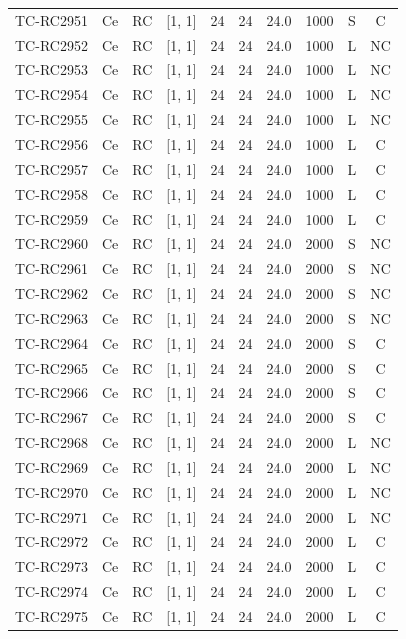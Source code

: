 \begin{longtable}{lccccccccc}
TC-RC2951 & Ce & RC & [1, 1] & 24 & 24 & 24.0 & 1000 & S & C \\
TC-RC2952 & Ce & RC & [1, 1] & 24 & 24 & 24.0 & 1000 & L & NC \\
TC-RC2953 & Ce & RC & [1, 1] & 24 & 24 & 24.0 & 1000 & L & NC \\
TC-RC2954 & Ce & RC & [1, 1] & 24 & 24 & 24.0 & 1000 & L & NC \\
TC-RC2955 & Ce & RC & [1, 1] & 24 & 24 & 24.0 & 1000 & L & NC \\
TC-RC2956 & Ce & RC & [1, 1] & 24 & 24 & 24.0 & 1000 & L & C \\
TC-RC2957 & Ce & RC & [1, 1] & 24 & 24 & 24.0 & 1000 & L & C \\
TC-RC2958 & Ce & RC & [1, 1] & 24 & 24 & 24.0 & 1000 & L & C \\
TC-RC2959 & Ce & RC & [1, 1] & 24 & 24 & 24.0 & 1000 & L & C \\
TC-RC2960 & Ce & RC & [1, 1] & 24 & 24 & 24.0 & 2000 & S & NC \\
TC-RC2961 & Ce & RC & [1, 1] & 24 & 24 & 24.0 & 2000 & S & NC \\
TC-RC2962 & Ce & RC & [1, 1] & 24 & 24 & 24.0 & 2000 & S & NC \\
TC-RC2963 & Ce & RC & [1, 1] & 24 & 24 & 24.0 & 2000 & S & NC \\
TC-RC2964 & Ce & RC & [1, 1] & 24 & 24 & 24.0 & 2000 & S & C \\
TC-RC2965 & Ce & RC & [1, 1] & 24 & 24 & 24.0 & 2000 & S & C \\
TC-RC2966 & Ce & RC & [1, 1] & 24 & 24 & 24.0 & 2000 & S & C \\
TC-RC2967 & Ce & RC & [1, 1] & 24 & 24 & 24.0 & 2000 & S & C \\
TC-RC2968 & Ce & RC & [1, 1] & 24 & 24 & 24.0 & 2000 & L & NC \\
TC-RC2969 & Ce & RC & [1, 1] & 24 & 24 & 24.0 & 2000 & L & NC \\
TC-RC2970 & Ce & RC & [1, 1] & 24 & 24 & 24.0 & 2000 & L & NC \\
TC-RC2971 & Ce & RC & [1, 1] & 24 & 24 & 24.0 & 2000 & L & NC \\
TC-RC2972 & Ce & RC & [1, 1] & 24 & 24 & 24.0 & 2000 & L & C \\
TC-RC2973 & Ce & RC & [1, 1] & 24 & 24 & 24.0 & 2000 & L & C \\
TC-RC2974 & Ce & RC & [1, 1] & 24 & 24 & 24.0 & 2000 & L & C \\
TC-RC2975 & Ce & RC & [1, 1] & 24 & 24 & 24.0 & 2000 & L & C \\

\end{longtable}
